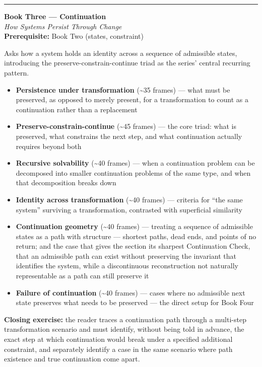 \documentclass[11pt]{article}
\newenvironment{bookentry}[3]{%
  \par\noindent\rule{\linewidth}{0.5pt}\par\vspace{0.5em}
  {\Large\bfseries #1}\\[0.15em]
  {\itshape\large #2}\\[0.3em]
  {\small\textbf{Prerequisite:} #3}\par\vspace{0.6em}
}{\par\vspace{0.8em}}
\newenvironment{sectionlist}{%
  \begin{itemize}[leftmargin=1.4em, itemsep=0.45em, topsep=0.3em]
}{%
  \end{itemize}
}
\newcommand{\secitem}[3]{\item \textbf{#1} (\textasciitilde#2 frames) --- #3}
\begin{document}
\begin{bookentry}{Book Three --- Continuation}{How Systems Persist Through Change}{Book Two (states, constraint)}
Asks how a system holds an identity across a sequence of admissible states, introducing the preserve-constrain-continue triad as the series' central recurring pattern.

\begin{sectionlist}
\secitem{Persistence under transformation}{35}{what must be preserved, as opposed to merely present, for a transformation to count as a continuation rather than a replacement}
\secitem{Preserve-constrain-continue}{45}{the core triad: what is preserved, what constrains the next step, and what continuation actually requires beyond both}
\secitem{Recursive solvability}{40}{when a continuation problem can be decomposed into smaller continuation problems of the same type, and when that decomposition breaks down}
\secitem{Identity across transformation}{40}{criteria for ``the same system'' surviving a transformation, contrasted with superficial similarity}
\secitem{Continuation geometry}{40}{treating a sequence of admissible states as a path with structure --- shortest paths, dead ends, and points of no return; and the case that gives the section its sharpest Continuation Check, that an admissible path can exist without preserving the invariant that identifies the system, while a discontinuous reconstruction not naturally representable as a path can still preserve it}
\secitem{Failure of continuation}{40}{cases where no admissible next state preserves what needs to be preserved --- the direct setup for Book Four}
\end{sectionlist}
\textbf{Closing exercise:} the reader traces a continuation path through a multi-step transformation scenario and must identify, without being told in advance, the exact step at which continuation would break under a specified additional constraint, and separately identify a case in the same scenario where path existence and true continuation come apart.
\end{bookentry}
\end{document}
